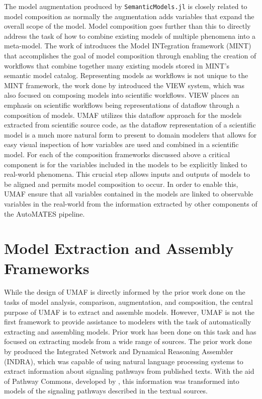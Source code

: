 The model augmentation produced by \texttt{SemanticModels.jl} is closely related to model composition as normally the augmentation adds variables that expand the overall scope of the model.
Model composition goes further than this to directly address the task of how to combine existing models of multiple phenomena into a meta-model.
The work of \citet{gil2018mint} introduces the Model INTegration framework (MINT) that accomplishes the goal of model composition through enabling the creation of workflows that combine together many existing models stored in MINT's semantic model catalog.
Representing models as workflows is not unique to the MINT framework, the work done by \citet{fei2010dataflow} introduced the VIEW system, which was also focused on composing models into scientific workflows.
VIEW places an emphasis on scientific workflows being representations of dataflow through a composition of models.
UMAF utilizes this dataflow approach for the models extracted from scientific source code, as the dataflow representation of a scientific model is a much more natural form to present to domain modelers that allows for easy visual inspection of how variables are used and combined in a scientific model.
For each of the composition frameworks discussed above a critical component is for the variables included in the models to be explicitly linked to real-world phenomena.
This crucial step allows inputs and outputs of models to be aligned and permits model composition to occur.
In order to enable this, UMAF ensure that all variables contained in the models are linked to observable variables in the real-world from the information extracted by other components of the AutoMATES pipeline.

\section{Model Extraction and Assembly Frameworks \label{sec:rwork_extract_assemble}}
While the design of UMAF is directly informed by the prior work done on the tasks of model analysis, comparison, augmentation, and composition, the central purpose of UMAF is to extract and assemble models.
However, UMAF is not the first framework to provide assistance to modelers with the task of automatically extracting and assembling models.
Prior work has been done on this task and has focused on extracting models from a wide range of sources.
The prior work done by \citet{gyori2017word} produced the Integrated Network and Dynamical Reasoning Assembler (INDRA), which was capable of using natural language processing systems to extract information about signaling pathways from published texts.
With the aid of Pathway Commons, developed by \citet{cerami2010pathway}, this information was transformed into models of the signaling pathways described in the textual sources.

